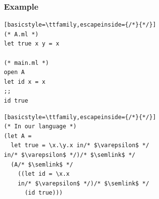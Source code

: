 \documentclass{beamer}
\newcommand*{\semlink}{\mathbin{\rotatebox[origin=c]{180}{$\propto$}}}
\begin{document}
\begin{frame}[c,fragile]
  \frametitle{Example}
  \begin{tcolorbox}[sidebyside, sidebyside align=top, fontupper=\scriptsize, fontlower=\scriptsize]
    \begin{lstlisting}[basicstyle=\ttfamily,escapeinside={/*}{*/}]
(* A.ml *)
let true x y = x

(* main.ml *)
open A
let id x = x
;;
id true
\end{lstlisting}
    \tcblower
    \begin{lstlisting}[basicstyle=\ttfamily,escapeinside={/*}{*/}]
(* In our language *)
(let A =
  let true = \x.\y.x in/* $\varepsilon$ */
in/* $\varepsilon$ */)/* $\semlink$ */
  (A/* $\semlink$ */
    ((let id = \x.x
    in/* $\varepsilon$ */)/* $\semlink$ */
      (id true)))
\end{lstlisting}
  \end{tcolorbox}
\end{frame}
\end{document}
